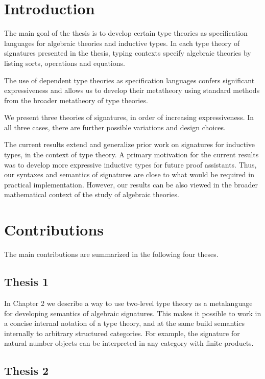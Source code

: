 \documentclass[12pt]{article}
\begin{document}
\section{Introduction}

The main goal of the thesis is to develop certain type theories as specification
languages for algebraic theories and inductive types. In each type theory of
signatures presented in the thesis, typing contexts specify algebraic theories
by listing sorts, operations and equations.

The use of dependent type theories as specification languages confers
significant expressiveness and allows us to develop their metatheory using
standard methods from the broader metatheory of type theories.

We present three theories of signatures, in order of increasing expressiveness.
In all three cases, there are further possible variations and design choices.

The current results extend and generalize prior work on signatures for inductive
types, in the context of type theory. A primary motivation for the current
results was to develop more expressive inductive types for future proof
assistants. Thus, our syntaxes and semantics of signatures are close to what
would be required in practical implementation. However, our results can be also
viewed in the broader mathematical context of the study of algebraic theories.

\section{Contributions}

The main contributions are summarized in the following four theses.

\subsection*{Thesis 1}

In Chapter 2 we describe a way to use two-level type theory \cite{twolevel} as a
metalanguage for developing semantics of algebraic signatures. This makes it
possible to work in a concise internal notation of a type theory, and at the
same build semantics internally to arbitrary structured categories. For example,
the signature for natural number objects can be interpreted in any category with
finite products.

\subsection*{Thesis 2}
\end{document}
